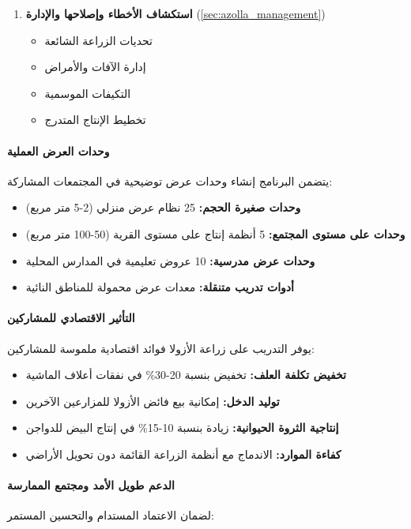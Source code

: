 \begin{enumerate}
    \item \textbf{استكشاف الأخطاء وإصلاحها والإدارة} (\ref{sec:azolla_management})
    \begin{itemize}
        \item تحديات الزراعة الشائعة
        \item إدارة الآفات والأمراض
        \item التكيفات الموسمية
        \item تخطيط الإنتاج المتدرج
    \end{itemize}
\end{enumerate}

\paragraph{وحدات العرض العملية}
يتضمن البرنامج إنشاء وحدات عرض توضيحية في المجتمعات المشاركة:

\begin{itemize}
    \item \textbf{وحدات صغيرة الحجم:} 25 نظام عرض منزلي (2-5 متر مربع)
    \item \textbf{وحدات على مستوى المجتمع:} 5 أنظمة إنتاج على مستوى القرية (50-100 متر مربع)
    \item \textbf{وحدات عرض مدرسية:} 10 عروض تعليمية في المدارس المحلية
    \item \textbf{أدوات تدريب متنقلة:} معدات عرض محمولة للمناطق النائية
\end{itemize}

\paragraph{التأثير الاقتصادي للمشاركين}
يوفر التدريب على زراعة الأزولا فوائد اقتصادية ملموسة للمشاركين:

\begin{itemize}
    \item \textbf{تخفيض تكلفة العلف:} تخفيض بنسبة 20-30\% في نفقات أعلاف الماشية
    \item \textbf{توليد الدخل:} إمكانية بيع فائض الأزولا للمزارعين الآخرين
    \item \textbf{إنتاجية الثروة الحيوانية:} زيادة بنسبة 10-15\% في إنتاج البيض للدواجن
    \item \textbf{كفاءة الموارد:} الاندماج مع أنظمة الزراعة القائمة دون تحويل الأراضي
\end{itemize}

\paragraph{الدعم طويل الأمد ومجتمع الممارسة}
لضمان الاعتماد المستدام والتحسين المستمر:

